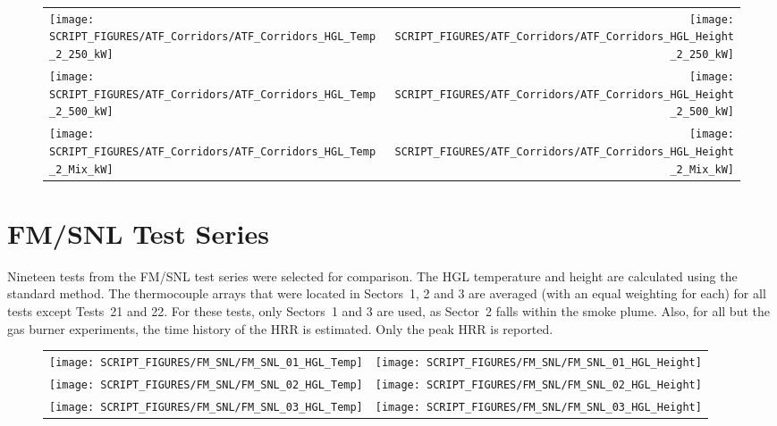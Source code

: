 \begin{figure}[p]
\begin{tabular*}{\textwidth}{l@{\extracolsep{\fill}}r}
\texttt{[image: SCRIPT\_FIGURES/ATF\_Corridors/ATF\_Corridors\_HGL\_Temp\_2\_250\_kW]} &
\texttt{[image: SCRIPT\_FIGURES/ATF\_Corridors/ATF\_Corridors\_HGL\_Height\_2\_250\_kW]} \\
\texttt{[image: SCRIPT\_FIGURES/ATF\_Corridors/ATF\_Corridors\_HGL\_Temp\_2\_500\_kW]} &
\texttt{[image: SCRIPT\_FIGURES/ATF\_Corridors/ATF\_Corridors\_HGL\_Height\_2\_500\_kW]} \\
\texttt{[image: SCRIPT\_FIGURES/ATF\_Corridors/ATF\_Corridors\_HGL\_Temp\_2\_Mix\_kW]} &
\texttt{[image: SCRIPT\_FIGURES/ATF\_Corridors/ATF\_Corridors\_HGL\_Height\_2\_Mix\_kW]}
\end{tabular*}
\end{figure}

\clearpage


\section{FM/SNL Test Series}

Nineteen tests from the FM/SNL test series were selected for comparison. The HGL temperature and height are calculated using the standard method. The thermocouple arrays that were located in Sectors~1, 2 and 3 are averaged (with an equal weighting for each) for all tests except Tests~21 and 22. For these tests, only Sectors~1 and 3 are used, as Sector~2 falls within the smoke plume. Also, for all but the gas burner experiments, the time history of the HRR is estimated. Only the peak HRR is reported.


\begin{figure}[h!]
\begin{tabular*}{\textwidth}{l@{\extracolsep{\fill}}r}
\texttt{[image: SCRIPT\_FIGURES/FM\_SNL/FM\_SNL\_01\_HGL\_Temp]} &
\texttt{[image: SCRIPT\_FIGURES/FM\_SNL/FM\_SNL\_01\_HGL\_Height]} \\
\texttt{[image: SCRIPT\_FIGURES/FM\_SNL/FM\_SNL\_02\_HGL\_Temp]} &
\texttt{[image: SCRIPT\_FIGURES/FM\_SNL/FM\_SNL\_02\_HGL\_Height]} \\
\texttt{[image: SCRIPT\_FIGURES/FM\_SNL/FM\_SNL\_03\_HGL\_Temp]} &
\texttt{[image: SCRIPT\_FIGURES/FM\_SNL/FM\_SNL\_03\_HGL\_Height]}
\end{tabular*}
\end{figure}

